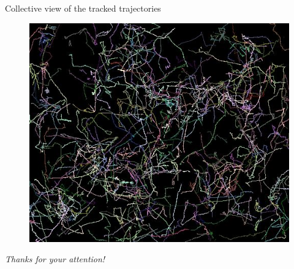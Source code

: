 \documentclass{beamer}
\begin{document}
  \begin{frame}{  Collective view of the tracked trajectories}


\begin{figure}
			 \centering
			   \includegraphics[scale=0.45]{../result}
		 \end{figure}

		
\end{frame} %

\begin{frame}{}
  \centering \Huge
  \emph{Thanks for your attention!}
\end{frame}



\end{document}
